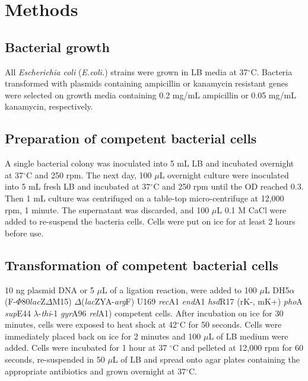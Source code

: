 \section{Methods}

\subsection{Bacterial growth}

All \textit{Escherichia coli} (\textit{E.coli.}) strains were grown in LB media at 37$^\circ$C. Bacteria transformed with plasmids containing ampicillin or kanamycin resistant genes were selected on growth media containing 0.2 mg/mL ampicillin or 0.05 mg/mL kanamycin, respectively.

\subsection{Preparation of competent bacterial cells}

A single bacterial colony was inoculated into 5 mL LB and incubated overnight at 37$^\circ$C and 250 rpm. The next day, 100 $\mu$L overnight culture were inoculated into 5 mL fresh LB and incubated at 37$^\circ$C and 250 rpm until the OD reached 0.3. Then 1 mL culture was centrifuged on a table-top micro-centrifuge at 12,000 rpm, 1 minute. The supernatant was discarded, and 100 $\mu$L 0.1 M CaCl were added to re-suspend the bacteria cells. Cells were put on ice for at least 2 hours before use.

\subsection{Transformation of competent bacterial cells}

10 ng plasmid DNA or 5 $\mu$L of a ligation reaction, were added to 100 $\mu$L DH5$\alpha$ (F-$\Phi80lac$Z$\Delta$M15) $\Delta$(\textit{lac}ZYA-\textit{arg}F) U169 \textit{rec}A1 \textit{end}A1 \textit{hsd}R17 (rK-, mK+) \textit{pho}A \textit{sup}E44 $\lambda$-\textit{thi}-1 \textit{gyr}A96 \textit{rel}A1) competent cells. After incubation on ice for 30 minutes, cells were exposed to heat shock at 42$^\circ$C for 50 seconds. Cells were immediately placed back on ice for 2 minutes and 100 $\mu$L of LB medium were added. Cells were incubated for 1 hour at 37 $^\circ$C and pelleted at 12,000 rpm for 60 seconds, re-suspended in 50 $\mu$L of LB and spread onto agar plates containing the appropriate antibiotics and grown overnight at 37$^\circ$C.

